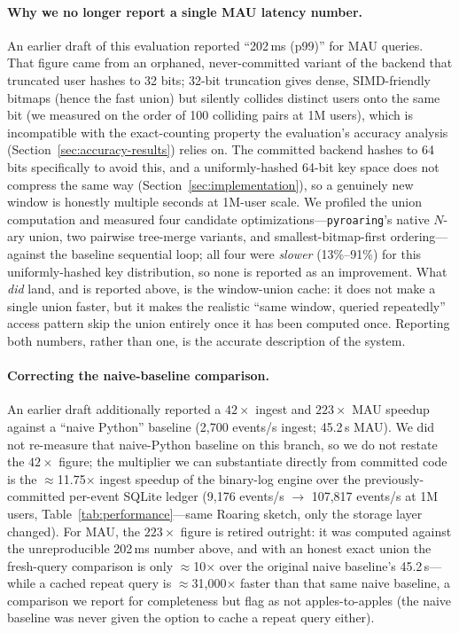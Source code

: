 \documentclass[sigconf,anonymous,review]{acmart}
\begin{document}
\paragraph{Why we no longer report a single MAU latency number.} An earlier draft of this evaluation reported ``202\,ms (p99)'' for MAU queries. That figure came from an orphaned, never-committed variant of the backend that truncated user hashes to 32 bits; 32-bit truncation gives dense, SIMD-friendly bitmaps (hence the fast union) but silently collides distinct users onto the same bit (we measured on the order of 100 colliding pairs at 1M users), which is incompatible with the exact-counting property the evaluation's accuracy analysis (Section~\ref{sec:accuracy-results}) relies on. The committed backend hashes to 64 bits specifically to avoid this, and a uniformly-hashed 64-bit key space does not compress the same way (Section~\ref{sec:implementation}), so a genuinely new window is honestly multiple seconds at 1M-user scale. We profiled the union computation and measured four candidate optimizations---\texttt{pyroaring}'s native $N$-ary union, two pairwise tree-merge variants, and smallest-bitmap-first ordering---against the baseline sequential loop; all four were \emph{slower} (13\%--91\%) for this uniformly-hashed key distribution, so none is reported as an improvement. What \emph{did} land, and is reported above, is the window-union cache: it does not make a single union faster, but it makes the realistic ``same window, queried repeatedly'' access pattern skip the union entirely once it has been computed once. Reporting both numbers, rather than one, is the accurate description of the system.

\paragraph{Correcting the naive-baseline comparison.} An earlier draft additionally reported a $42\times$ ingest and $223\times$ MAU speedup against a ``naive Python'' baseline (2,700 events/s ingest; 45.2\,s MAU). We did not re-measure that naive-Python baseline on this branch, so we do not restate the $42\times$ figure; the multiplier we can substantiate directly from committed code is the $\approx$11.75$\times$ ingest speedup of the binary-log engine over the previously-committed per-event SQLite ledger (9,176 events/s $\to$ 107,817 events/s at 1M users, Table~\ref{tab:performance}---same Roaring sketch, only the storage layer changed). For MAU, the $223\times$ figure is retired outright: it was computed against the unreproducible 202\,ms number above, and with an honest exact union the fresh-query comparison is only $\approx$10$\times$ over the original naive baseline's 45.2\,s---while a cached repeat query is $\approx$31,000$\times$ faster than that same naive baseline, a comparison we report for completeness but flag as not apples-to-apples (the naive baseline was never given the option to cache a repeat query either).
\end{document}
